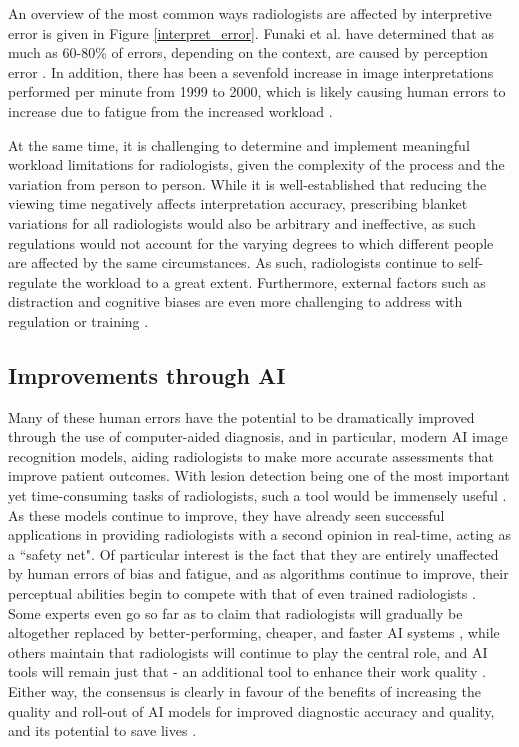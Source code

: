 An overview of the most common ways radiologists are affected by interpretive error is given in Figure \ref{interpret_error}. Funaki et al. have determined that as much as 60-80\% of errors, depending on the context, are caused by perception error \cite{perception_error}. In addition, there has been a sevenfold increase in image interpretations performed per minute from 1999 to 2000, which is likely causing human errors to increase due to fatigue from the increased workload \cite{radiology_error}. 

At the same time, it is challenging to determine and implement meaningful workload limitations for radiologists, given the complexity of the process and the variation from person to person. While it is well-established that reducing the viewing time negatively affects interpretation accuracy, prescribing blanket variations for all radiologists would also be arbitrary and ineffective, as such regulations would not account for the varying degrees to which different people are affected by the same circumstances. As such, radiologists continue to self-regulate the workload to a great extent. Furthermore, external factors such as distraction and cognitive biases are even more challenging to address with regulation or training \cite{workload}. 

\subsection{Improvements through AI}
Many of these human errors have the potential to be dramatically improved through the use of computer-aided diagnosis, and in particular, modern AI image recognition models, aiding radiologists to make more accurate assessments that improve patient outcomes. With lesion detection being one of the most important yet time-consuming tasks of radiologists, such a tool would be immensely useful \cite{deep_learning_survey}. As these models continue to improve, they have already seen successful applications in providing radiologists with a second opinion in real-time, acting as a ``safety net". Of particular interest is the fact that they are entirely unaffected by human errors of bias and fatigue, and as algorithms continue to improve, their perceptual abilities begin to compete with that of even trained radiologists \cite{workload}. Some experts even go so far as to claim that radiologists will gradually be altogether replaced by better-performing, cheaper, and faster AI systems \cite{ai_foe}, while others maintain that radiologists will continue to play the central role, and AI tools will remain just that - an additional tool to enhance their work quality \cite{doctors_ftw}. Either way, the consensus is clearly in favour of the benefits of increasing the quality and roll-out of AI models for improved diagnostic accuracy and quality, and its potential to save lives \cite{consensus}\cite{ai_adoption}. 

